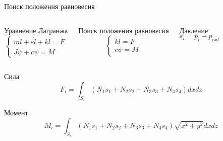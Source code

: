 \documentclass[ignoreonframetext,unicode]{beamer}
\begin{document}
\begin{frame}{Поиск положения равновесия}
	
	\vspace*{-3mm}
		\begin{columns}
	
	
			\begin{block}{Уравнение Лагранжа}
				\vspace*{-4mm}
			\begin{equation*}
				\begin{cases*}
					m \ddot{l} + \varepsilon \dot{l} + k l  = F \\
					J \ddot{\psi} + c \psi = M
				\end{cases*}
				\label{lagrsdfdsfsange_fin}
			\end{equation*}
			\end{block}

			\begin{block}{Поиск положения равновесия}
			\begin{equation*}
				\begin{cases*}
					k l = F \\
					c \psi = M
				\end{cases*}
				\label{temp_ldsfsdfsdfagr}
			\end{equation*}
			\end{block}
	
	
			\begin{block}{Давление}
				\vspace*{2mm}
				\begin{equation*}
					s_i = p_i - p_{ext}
					\label{kjdsbafabjb}
				\end{equation*}
			\end{block}
		
\end{columns}

	\vspace*{-2mm}
	\begin{block}{Сила}
	\begin{equation*}
		F_i = \int_{S_i} { \left( N_1 s_1 + N_2 s_2 + N_3 s_3 + N_4 s_4 \right)  dx dz}
	\end{equation*}
	\end{block}

	\vspace*{-2mm}
	\begin{block}{Момент}
	\begin{equation*}
		M_i = \int_{S_i} { \left( N_1 s_1 + N_2 s_2 + N_3 s_3 + N_4 s_4 \right) \sqrt{x^2 + y^2}  dx dz}
	\end{equation*}
	\end{block}


\end{frame}
\end{document}
